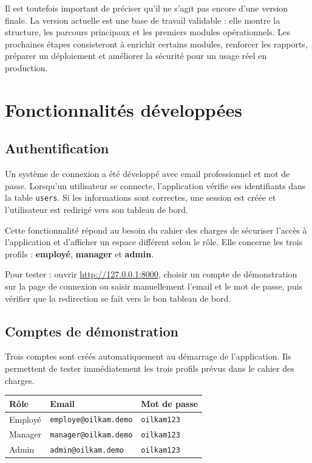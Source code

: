 \documentclass[11pt,a4paper]{article}
\newcommand{\role}[1]{\textbf{\color{oilgreen}#1}}
\newcommand{\code}[1]{\texttt{#1}}
\begin{document}
Il est toutefois important de préciser qu'il ne s'agit pas encore d'une version finale. La version actuelle est une base de travail validable : elle montre la structure, les parcours principaux et les premiers modules opérationnels. Les prochaines étapes consisteront à enrichir certains modules, renforcer les rapports, préparer un déploiement et améliorer la sécurité pour un usage réel en production.

\section{Fonctionnalités développées}

\subsection{Authentification}

Un système de connexion a été développé avec email professionnel et mot de passe. Lorsqu'un utilisateur se connecte, l'application vérifie ses identifiants dans la table \code{users}. Si les informations sont correctes, une session est créée et l'utilisateur est redirigé vers son tableau de bord.

Cette fonctionnalité répond au besoin du cahier des charges de sécuriser l'accès à l'application et d'afficher un espace différent selon le rôle. Elle concerne les trois profils : \role{employé}, \role{manager} et \role{admin}.

Pour tester : ouvrir \url{http://127.0.0.1:8000}, choisir un compte de démonstration sur la page de connexion ou saisir manuellement l'email et le mot de passe, puis vérifier que la redirection se fait vers le bon tableau de bord.

\subsection{Comptes de démonstration}

Trois comptes sont créés automatiquement au démarrage de l'application. Ils permettent de tester immédiatement les trois profils prévus dans le cahier des charges.

\begin{center}
\begin{tabular}{|p{3cm}|p{5cm}|p{3cm}|}
\hline
\textbf{Rôle} & \textbf{Email} & \textbf{Mot de passe} \\
\hline
Employé & \code{employe@oilkam.demo} & \code{oilkam123} \\
\hline
Manager & \code{manager@oilkam.demo} & \code{oilkam123} \\
\hline
Admin & \code{admin@oilkam.demo} & \code{oilkam123} \\
\hline
\end{tabular}
\end{center}
\end{document}
